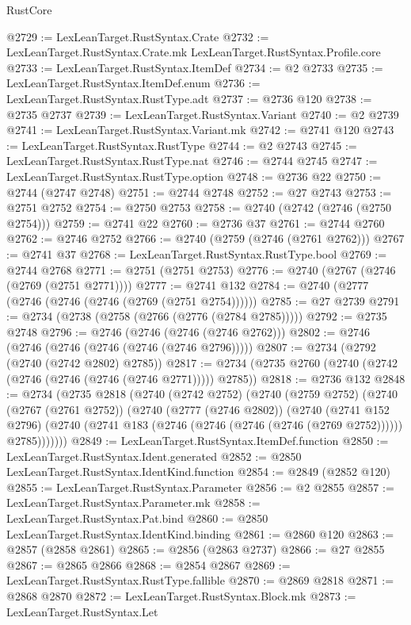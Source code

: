 \begin{lexlean}{RustCore}
\begin{coremodule}
@2729 := LexLeanTarget.RustSyntax.Crate
@2732 := LexLeanTarget.RustSyntax.Crate.mk LexLeanTarget.RustSyntax.Profile.core
@2733 := LexLeanTarget.RustSyntax.ItemDef
@2734 := @2 @2733
@2735 := LexLeanTarget.RustSyntax.ItemDef.enum
@2736 := LexLeanTarget.RustSyntax.RustType.adt
@2737 := @2736 @120
@2738 := @2735 @2737
@2739 := LexLeanTarget.RustSyntax.Variant
@2740 := @2 @2739
@2741 := LexLeanTarget.RustSyntax.Variant.mk
@2742 := @2741 @120
@2743 := LexLeanTarget.RustSyntax.RustType
@2744 := @2 @2743
@2745 := LexLeanTarget.RustSyntax.RustType.nat
@2746 := @2744 @2745
@2747 := LexLeanTarget.RustSyntax.RustType.option
@2748 := @2736 @22
@2750 := @2744 (@2747 @2748)
@2751 := @2744 @2748
@2752 := @27 @2743
@2753 := @2751 @2752
@2754 := @2750 @2753
@2758 := @2740 (@2742 (@2746 (@2750 @2754)))
@2759 := @2741 @22
@2760 := @2736 @37
@2761 := @2744 @2760
@2762 := @2746 @2752
@2766 := @2740 (@2759 (@2746 (@2761 @2762)))
@2767 := @2741 @37
@2768 := LexLeanTarget.RustSyntax.RustType.bool
@2769 := @2744 @2768
@2771 := @2751 (@2751 @2753)
@2776 := @2740 (@2767 (@2746 (@2769 (@2751 @2771))))
@2777 := @2741 @132
@2784 := @2740 (@2777 (@2746 (@2746 (@2746 (@2769 (@2751 @2754))))))
@2785 := @27 @2739
@2791 := @2734 (@2738 (@2758 (@2766 (@2776 (@2784 @2785)))))
@2792 := @2735 @2748
@2796 := @2746 (@2746 (@2746 (@2746 @2762)))
@2802 := @2746 (@2746 (@2746 (@2746 (@2746 (@2746 @2796)))))
@2807 := @2734 (@2792 (@2740 (@2742 @2802) @2785))
@2817 := @2734 (@2735 @2760 (@2740 (@2742 (@2746 (@2746 (@2746 (@2746 @2771))))) @2785))
@2818 := @2736 @132
@2848 := @2734
    (@2735
      @2818
      (@2740
        (@2742 @2752)
        (@2740
          (@2759 @2752)
          (@2740
            (@2767 (@2761 @2752))
            (@2740
              (@2777 (@2746 @2802))
              (@2740
                (@2741 @152 @2796)
                (@2740 (@2741 @183 (@2746 (@2746 (@2746 (@2746 (@2769 @2752)))))) @2785)))))))
@2849 := LexLeanTarget.RustSyntax.ItemDef.function
@2850 := LexLeanTarget.RustSyntax.Ident.generated
@2852 := @2850 LexLeanTarget.RustSyntax.IdentKind.function
@2854 := @2849 (@2852 @120)
@2855 := LexLeanTarget.RustSyntax.Parameter
@2856 := @2 @2855
@2857 := LexLeanTarget.RustSyntax.Parameter.mk
@2858 := LexLeanTarget.RustSyntax.Pat.bind
@2860 := @2850 LexLeanTarget.RustSyntax.IdentKind.binding
@2861 := @2860 @120
@2863 := @2857 (@2858 @2861)
@2865 := @2856 (@2863 @2737)
@2866 := @27 @2855
@2867 := @2865 @2866
@2868 := @2854 @2867
@2869 := LexLeanTarget.RustSyntax.RustType.fallible
@2870 := @2869 @2818
@2871 := @2868 @2870
@2872 := LexLeanTarget.RustSyntax.Block.mk
@2873 := LexLeanTarget.RustSyntax.Let

\end{coremodule}
\end{lexlean}
